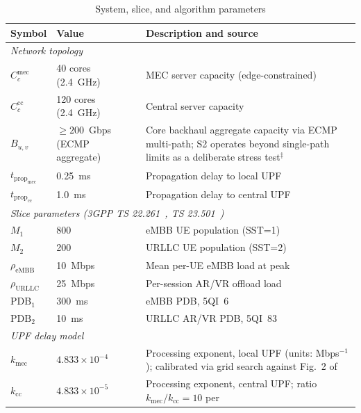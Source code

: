 \documentclass[conference]{IEEEtran}
\begin{document}
\begin{table}[ht]
\centering
\caption{System, slice, and algorithm parameters}
\label{tab:params}
\renewcommand{\arraystretch}{1.15}
\begin{tabular}{p{1.8cm}p{2.2cm}p{3.6cm}}
\toprule
\textbf{Symbol} & \textbf{Value} &
\textbf{Description and source} \\
\midrule
\multicolumn{3}{l}{\textit{Network topology}} \\
$C_c^\text{mec}$ & 40 cores (2.4~GHz) &
  MEC server capacity (edge-constrained) \\
$C_c^\text{cc}$ & 120 cores (2.4~GHz) &
  Central server capacity \\
$B_{u,v}$ & $\geq\!200$~Gbps (ECMP aggregate) &
  Core backhaul aggregate capacity via ECMP multi-path;
  S2 operates beyond single-path limits as a deliberate
  stress test$^\ddagger$ \\
$t_{\text{prop}_\text{mec}}$ & 0.25~ms &
  Propagation delay to local UPF \\
$t_{\text{prop}_\text{cc}}$ & 1.0~ms &
  Propagation delay to central UPF \\
\midrule
\multicolumn{3}{l}{\textit{Slice parameters
  (3GPP TS 22.261~\cite{3gpp_ts22261},
   TS 23.501~\cite{3gpp_ts23501})}} \\
$M_1$ & 800 &
  eMBB UE population (SST=1) \\
$M_2$ & 200 &
  URLLC UE population (SST=2) \\
$\rho_\text{eMBB}$ & 10~Mbps &
  Mean per-UE eMBB load at
  peak~\cite{superbowl_lvii,ericsson_f1_2023} \\
$\rho_\text{URLLC}$ & 25~Mbps &
  Per-session AR/VR offload
  load~\cite{yaqoob2020survey_360video} \\
$\text{PDB}_1$ & 300~ms &
  eMBB PDB, 5QI~6~\cite{3gpp_ts23501} \\
$\text{PDB}_2$ & 10~ms &
  URLLC AR/VR PDB,
  5QI~83~\cite{3gpp_ts22261} \\
\midrule
\multicolumn{3}{l}{\textit{UPF delay
  model~\cite{Alevizaki2021upf}}} \\
$k_\text{mec}$ & $4.833\!\times\!10^{-4}$ &
  Processing exponent, local UPF
  (units: Mbps$^{-1}$); calibrated via
  grid search against Fig.~2
  of~\cite{Alevizaki2021upf} \\
$k_\text{cc}$ & $4.833\!\times\!10^{-5}$ &
  Processing exponent, central UPF;
  ratio $k_\text{mec}/k_\text{cc}=10$
  per~\cite{Alevizaki2021upf} \\

\end{tabular}
\end{table}
\end{document}
